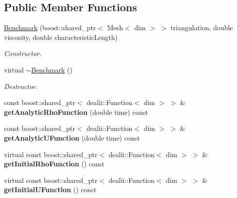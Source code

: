 \subsection*{Public Member Functions}
\begin{DoxyCompactItemize}
\item 
\hypertarget{classnatrium_1_1Benchmark_ae6a264a86ce3a7ca25cb2685e71d6075}{
\hyperlink{classnatrium_1_1Benchmark_ae6a264a86ce3a7ca25cb2685e71d6075}{Benchmark} (boost::shared\_\-ptr$<$ Mesh$<$ dim $>$ $>$ triangulation, double viscosity, double characteristicLength)}
\label{classnatrium_1_1Benchmark_ae6a264a86ce3a7ca25cb2685e71d6075}

\begin{DoxyCompactList}\small\item\em Constructor. \item\end{DoxyCompactList}\item 
\hypertarget{classnatrium_1_1Benchmark_a9560e49a097a369ec972b72fb2873a2e}{
virtual \hyperlink{classnatrium_1_1Benchmark_a9560e49a097a369ec972b72fb2873a2e}{$\sim$Benchmark} ()}
\label{classnatrium_1_1Benchmark_a9560e49a097a369ec972b72fb2873a2e}

\begin{DoxyCompactList}\small\item\em Destructor. \item\end{DoxyCompactList}\item 
\hypertarget{classnatrium_1_1Benchmark_ac3dcec8fee0573c9a9a2a951cc4e5cab}{
const boost::shared\_\-ptr$<$ dealii::Function$<$ dim $>$ $>$ \& {\bfseries getAnalyticRhoFunction} (double time) const }
\label{classnatrium_1_1Benchmark_ac3dcec8fee0573c9a9a2a951cc4e5cab}

\item 
\hypertarget{classnatrium_1_1Benchmark_a13f863e6c53b1872b5ce622a13f3029f}{
const boost::shared\_\-ptr$<$ dealii::Function$<$ dim $>$ $>$ \& {\bfseries getAnalyticUFunction} (double time) const }
\label{classnatrium_1_1Benchmark_a13f863e6c53b1872b5ce622a13f3029f}

\item 
\hypertarget{classnatrium_1_1Benchmark_a0e6506ff88d1612a0277b6ceab77682d}{
virtual const boost::shared\_\-ptr$<$ dealii::Function$<$ dim $>$ $>$ \& {\bfseries getInitialRhoFunction} () const }
\label{classnatrium_1_1Benchmark_a0e6506ff88d1612a0277b6ceab77682d}

\item 
\hypertarget{classnatrium_1_1Benchmark_a41d01e18167c6381bc08363d4f26989b}{
virtual const boost::shared\_\-ptr$<$ dealii::Function$<$ dim $>$ $>$ \& {\bfseries getInitialUFunction} () const }
\label{classnatrium_1_1Benchmark_a41d01e18167c6381bc08363d4f26989b}

\end{DoxyCompactItemize}
